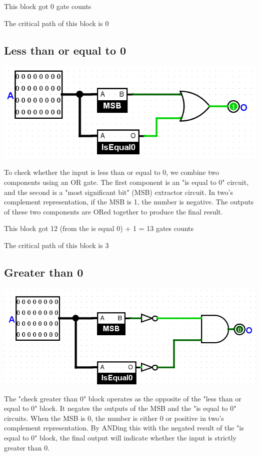 \documentclass{article}
\begin{document}
\hspace{2em}This block got 0 gate counts

\hspace{2em}The critical path of this block is 0
\subsection{Less than or equal to 0}
\begin{center}
    \includegraphics[width=1\textwidth]{images/LessThanOrEqual0.png}
\end{center}

\hspace{2em}To check whether the input is less than or equal to 0, we combine two components using an OR gate. The first component is an "is equal to 0" circuit, and the second is a "most significant bit" (MSB) extractor circuit. In two's complement representation, if the MSB is 1, the number is negative. The outputs of these two components are ORed together to produce the final result.

\hspace{2em}This block got 12 (from the is equal 0) + 1 = 13 gates counts

\hspace{2em}The critical path of this block is 3
\subsection{Greater than 0}
\begin{center}
    \includegraphics[width=1\textwidth]{images/GreaterThan0.png}
\end{center}
\hspace{2em}The "check greater than 0" block operates as the opposite of the "less than or equal to 0" block. It negates the outputs of the MSB and the "is equal to 0" circuits. When the MSB is 0, the number is either 0 or positive in two's complement representation. By ANDing this with the negated result of the "is equal to 0" block, the final output will indicate whether the input is strictly greater than 0.
\end{document}
